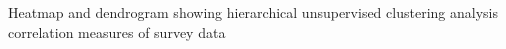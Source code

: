 Heatmap and dendrogram showing hierarchical unsupervised clustering analysis correlation measures of survey data
